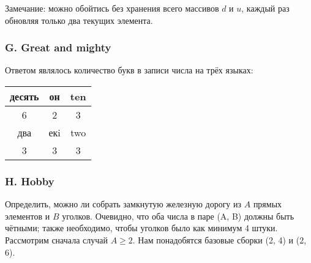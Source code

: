Замечание: можно обойтись без хранения всего массивов $d$ и $u$, каждый раз обновляя только два текущих элемента.



\subsubsection*{G. Great and mighty} 


Ответом являлось количество букв в записи числа
на трёх языках:
\begin{center}
\begin{tabular}{|c|c|c|}
\hline
десять & он & ten \\
\hline
6 & 2 & 3 \\
\hline
два & екi & two \\
\hline
3 & 3 & 3 \\
\hline
\end{tabular}
\end{center}



\subsubsection*{H. Hobby} 


Определить, можно ли собрать замкнутую железную дорогу из $A$ прямых элементов и $B$ уголков. Очевидно, что оба числа в паре (A, B) должны быть чётными; также необходимо, чтобы уголков было как минимум 4 штуки. Рассмотрим сначала
случай $A \geqslant 2$. Нам понадобятся базовые сборки (2, 4) и (2, 6).

